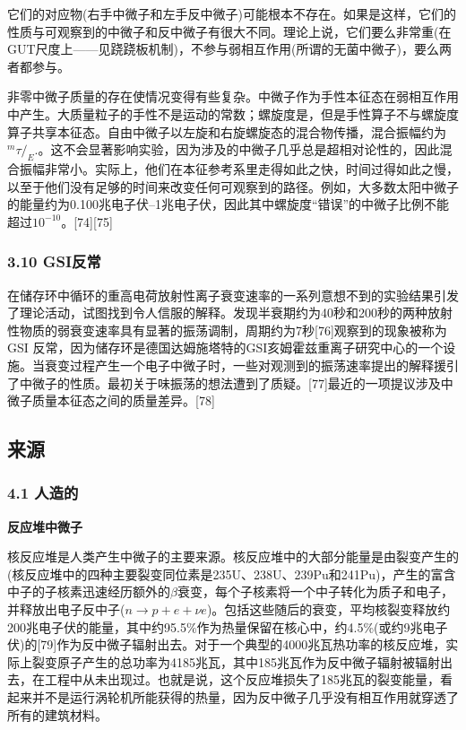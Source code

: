 它们的对应物(右手中微子和左手反中微子)可能根本不存在。如果是这样，它们的性质与可观察到的中微子和反中微子有很大不同。理论上说，它们要么非常重(在GUT尺度上——见跷跷板机制)，不参与弱相互作用(所谓的无菌中微子)，要么两者都参与。

非零中微子质量的存在使情况变得有些复杂。中微子作为手性本征态在弱相互作用中产生。大质量粒子的手性不是运动的常数；螺旋度是，但是手性算子不与螺旋度算子共享本征态。自由中微子以左旋和右旋螺旋态的混合物传播，混合振幅约为$^m\tau/_E$.。这不会显著影响实验，因为涉及的中微子几乎总是超相对论性的，因此混合振幅非常小。实际上，他们在本征参考系里走得如此之快，时间过得如此之慢，以至于他们没有足够的时间来改变任何可观察到的路径。例如，大多数太阳中微子的能量约为0.100兆电子伏–1兆电子伏，因此其中螺旋度“错误”的中微子比例不能超过$10^{-10}$。[74][75]

\subsubsection{3.10 GSI反常}
在储存环中循环的重高电荷放射性离子衰变速率的一系列意想不到的实验结果引发了理论活动，试图找到令人信服的解释。发现半衰期约为40秒和200秒的两种放射性物质的弱衰变速率具有显著的振荡调制，周期约为7秒[76]观察到的现象被称为GSI 反常，因为储存环是德国达姆施塔特的GSI亥姆霍兹重离子研究中心的一个设施。当衰变过程产生一个电子中微子时，一些对观测到的振荡速率提出的解释援引了中微子的性质。最初关于味振荡的想法遭到了质疑。[77]最近的一项提议涉及中微子质量本征态之间的质量差异。[78]

\subsection{来源}
\subsubsection{4.1 人造的}
\textbf{反应堆中微子}

核反应堆是人类产生中微子的主要来源。核反应堆中的大部分能量是由裂变产生的(核反应堆中的四种主要裂变同位素是235U、238U、239Pu和241Pu)，产生的富含中子的子核素迅速经历额外的$\beta$衰变，每个子核素将一个中子转化为质子和电子，并释放出电子反中子($n\to p+e+\nu e$)。包括这些随后的衰变，平均核裂变释放约200兆电子伏的能量，其中约95.5\%作为热量保留在核心中，约4.5\%(或约9兆电子伏)的[79]作为反中微子辐射出去。对于一个典型的4000兆瓦热功率的核反应堆，实际上裂变原子产生的总功率为4185兆瓦，其中185兆瓦作为反中微子辐射被辐射出去，在工程中从未出现过。也就是说，这个反应堆损失了185兆瓦的裂变能量，看起来并不是运行涡轮机所能获得的热量，因为反中微子几乎没有相互作用就穿透了所有的建筑材料。

